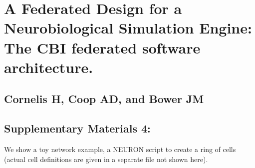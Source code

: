 \documentclass[10pt]{article}
\begin{document}
\section*{A Federated Design for a Neurobiological Simulation Engine: 
The CBI federated software architecture.}
\subsection*{Cornelis H, Coop AD, and Bower JM}
\subsection*{Supplementary Materials 4:} 

We show a toy network example, a NEURON script to create a ring of cells (actual cell definitions are given in a separate file not shown here).
\end{document}

